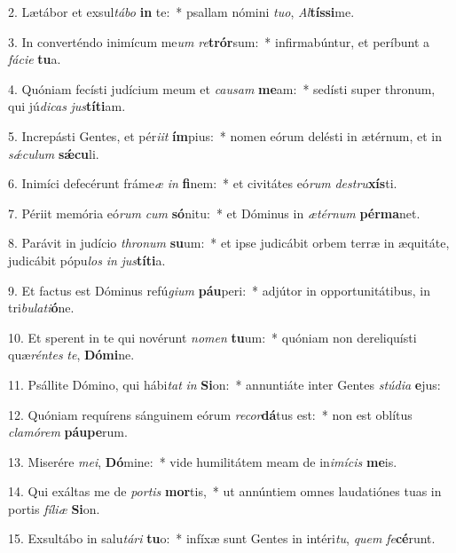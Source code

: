 2. Lætábor et exsul\textit{tá}\textit{bo} \textbf{in} te:~*  psallam nómini \textit{tu}\textit{o}, \textit{Al}\textbf{tís}\textbf{si}me.\

3. In converténdo inimícum me\textit{um} \textit{re}\textbf{trór}sum:~*  infirmabúntur, et períbunt a \textit{fá}\textit{ci}\textit{e} \textbf{tu}a.\

4. Quóniam fecísti judícium meum et \textit{cau}\textit{sam} \textbf{me}am:~*  sedísti super thronum, qui jú\textit{di}\textit{cas} \textit{jus}\textbf{tí}\textbf{ti}am.\

5. Increpásti Gentes, et pér\textit{i}\textit{it} \textbf{ím}pius:~*  nomen eórum delésti in ætérnum, et in \textit{sǽ}\textit{cu}\textit{lum} \textbf{sǽ}\textbf{cu}li.\

6. Inimíci defecérunt fráme\textit{æ} \textit{in} \textbf{fi}nem:~*  et civitátes eó\textit{rum} \textit{de}\textit{stru}\textbf{xís}ti.\

7. Périit memória eó\textit{rum} \textit{cum} \textbf{só}nitu:~*  et Dóminus in \textit{æ}\textit{tér}\textit{num} \textbf{pér}\textbf{ma}net.\

8. Parávit in judício \textit{thro}\textit{num} \textbf{su}um:~*  et ipse judicábit orbem terræ in æquitáte, judicábit pópu\textit{los} \textit{in} \textit{jus}\textbf{tí}\textbf{ti}a.\

9. Et factus est Dóminus refú\textit{gi}\textit{um} \textbf{páu}peri:~*  adjútor in opportunitátibus, in tri\textit{bu}\textit{la}\textit{ti}\textbf{ó}ne.\

10. Et sperent in te qui novérunt \textit{no}\textit{men} \textbf{tu}um:~*  quóniam non dereliquísti quæ\textit{rén}\textit{tes} \textit{te}, \textbf{Dó}\textbf{mi}ne.\

11. Psállite Dómino, qui hábi\textit{tat} \textit{in} \textbf{Si}on:~*  annuntiáte inter Gentes \textit{stú}\textit{di}\textit{a} \textbf{e}jus:\

12. Quóniam requírens sánguinem eórum \textit{re}\textit{cor}\textbf{dá}tus est:~*  non est oblítus \textit{cla}\textit{mó}\textit{rem} \textbf{páu}\textbf{pe}rum.\

13. Miserére \textit{me}\textit{i}, \textbf{Dó}mine:~*  vide humilitátem meam de in\textit{i}\textit{mí}\textit{cis} \textbf{me}is.\

14. Qui exáltas me de \textit{por}\textit{tis} \textbf{mor}tis,~*  ut annúntiem omnes laudatiónes tuas in portis \textit{fí}\textit{li}\textit{æ} \textbf{Si}on.\

15. Exsultábo in salu\textit{tá}\textit{ri} \textbf{tu}o:~*  infíxæ sunt Gentes in intéri\textit{tu}, \textit{quem} \textit{fe}\textbf{cé}runt.\

